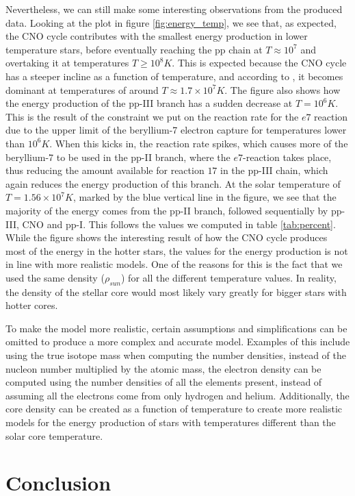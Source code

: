 \documentclass[a4paper,10pt,english]{article}
\begin{document}
Nevertheless, we can still make some interesting observations from the produced data. Looking at the plot in figure \ref{fig:energy_temp}, we see that, as expected, the CNO cycle contributes with the smallest energy production in lower temperature stars, before eventually reaching the pp chain at $T \approx 10^7$ and overtaking it at temperatures $T \geq 10^8 K$. This is expected because the CNO cycle has a steeper incline as a function of temperature, and according to \cite{Schuler2009}, it becomes dominant at temperatures of around $T \approx 1.7 \times 10^7 K$. The figure also shows how the energy production of the pp-III branch has a sudden decrease at $T=10^6K$. This is the result of the constraint we put on the reaction rate for the $e7$ reaction due to the upper limit of the beryllium-7 electron capture for temperatures lower than $10^6 K$. When this kicks in, the reaction rate spikes, which causes more of the beryllium-7 to be used in the pp-II branch, where the $e7$-reaction takes place, thus reducing the amount available for reaction $17$ in the pp-III chain, which again reduces the energy production of this branch. 
At the solar temperature of $T = 1.56\times 10^7 K$, marked by the blue vertical line in the figure, we see that the majority of the energy comes from the pp-II branch, followed sequentially by pp-III, CNO and pp-I. This follows the values we computed in table \ref{tab:percent}. While the figure shows the interesting result of how the CNO cycle produces most of the energy in the hotter stars, the values for the energy production is not in line with more realistic models. One of the reasons for this is the fact that we used the same density ($\rho_{sun}$) for all the different temperature values. In reality, the density of the stellar core would most likely vary greatly for bigger stars with hotter cores.

To make the model more realistic, certain assumptions and simplifications can be omitted to produce a more complex and accurate model. Examples of this include using the true isotope mass when computing the number densities, instead of the nucleon number multiplied by the atomic mass, the electron density can be computed using the number densities of all the elements present, instead of assuming all the electrons come from only hydrogen and helium. Additionally, the core density can be created as a function of temperature to create more realistic models for the energy production of stars with temperatures different than the solar core temperature.

\section{Conclusion}
\end{document}
